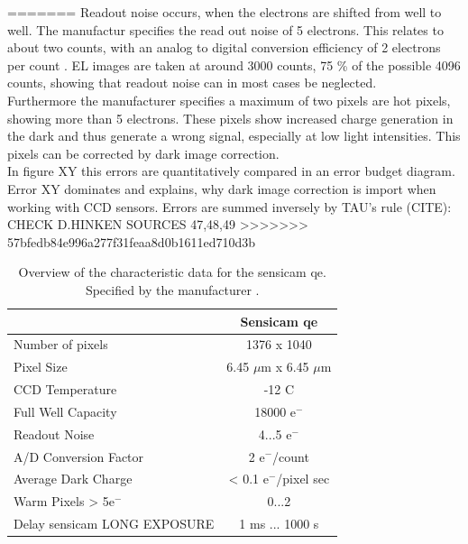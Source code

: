 =======
Readout noise occurs, when the electrons are shifted from well to well. The manufactur specifies the read out noise of 5 electrons. This relates to about two counts, with an analog to digital conversion efficiency of 2 electrons per count \cite{ManualSensicam}. EL images are taken at around 3000 counts, 75 \% of the possible 4096 counts, showing that readout noise can in most cases be neglected. \\
Furthermore the manufacturer specifies a maximum of two pixels are hot pixels, showing more than 5 electrons. These pixels show increased charge generation in the dark and thus generate a wrong signal, especially at low light intensities. This pixels can be corrected by dark image correction.  \\
In figure XY this errors are quantitatively compared in an error budget diagram. Error XY dominates and explains, why dark image correction is import when working with CCD sensors. Errors are summed inversely by TAU's rule (CITE):\\
CHECK D.HINKEN SOURCES 47,48,49 
>>>>>>> 57bfedb84e996a277f31feaa8d0b1611ed710d3b
\begin{table}[h]
	\centering
	\caption{Overview of the characteristic data for the sensicam qe. Specified by the manufacturer \cite{ManualSensicam}.}
	\label{table:CCDcamera}
	\begin{tabular}{l c}
		\hline
		\rowcolor{lightgray}
		& \textbf{Sensicam qe} \\ \hline
		Number of pixels & 1376 x 1040 \\
		Pixel Size & 6.45 $\mu$m x 6.45 $\mu$m \\
		CCD Temperature & -12 \textdegree C \\
		Full Well Capacity & 18000 e$^-$ \\
		Readout Noise & 4...5 e$^-$ \\
		A/D Conversion Factor & 2 e$^-$/count \\
		Average Dark Charge & < 0.1 e$^-$/pixel sec \\
		Warm Pixels > 5e$^-$ & 0...2 \\
		Delay sensicam LONG EXPOSURE & 1 ms ... 1000 s \\ \hline
	\end{tabular}
\end{table}